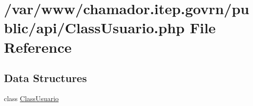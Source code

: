 \hypertarget{_class_usuario_8php}{}\section{/var/www/chamador.itep.\+govrn/public/api/\+Class\+Usuario.php File Reference}
\label{_class_usuario_8php}
\subsection*{Data Structures}
\begin{DoxyCompactItemize}
\item 
class \hyperlink{class_class_usuario}{Class\+Usuario}
\end{DoxyCompactItemize}
